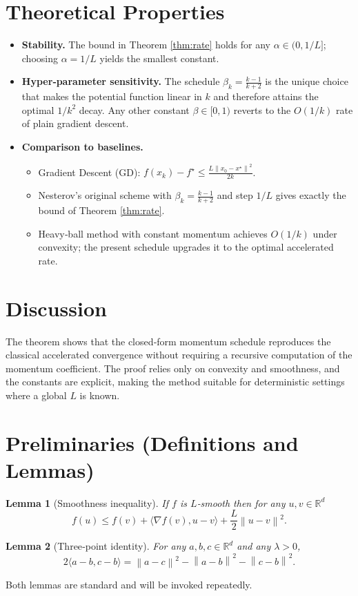 \documentclass{article}
\newtheorem{lemma}{Lemma}
\newcommand{\R}{\mathbb{R}}
\newcommand{\norm}[1]{\left\|#1\right\|}
\newcommand{\grad}{\nabla}
\begin{document}
\section*{Theoretical Properties}
\begin{itemize}
    \item \textbf{Stability.} The bound in Theorem \ref{thm:rate} holds for any $\alpha\in(0,1/L]$; choosing $\alpha=1/L$ yields the smallest constant.
    \item \textbf{Hyper‑parameter sensitivity.} The schedule $\beta_k=\frac{k-1}{k+2}$ is the unique choice that makes the potential function linear in $k$ and therefore attains the optimal $1/k^2$ decay. Any other constant $\beta\in[0,1)$ reverts to the $O(1/k)$ rate of plain gradient descent.
    \item \textbf{Comparison to baselines.}
    \begin{itemize}
        \item Gradient Descent (GD): $f(x_k)-f^\star\le \frac{L\norm{x_0-x^\star}^2}{2k}$.
        \item Nesterov’s original scheme with $\beta_k=\frac{k-1}{k+2}$ and step $1/L$ gives exactly the bound of Theorem \ref{thm:rate}.
        \item Heavy‑ball method with constant momentum achieves $O(1/k)$ under convexity; the present schedule upgrades it to the optimal accelerated rate.
    \end{itemize}
\end{itemize}

\section*{Discussion}
The theorem shows that the closed‑form momentum schedule reproduces the classical accelerated convergence without requiring a recursive computation of the momentum coefficient. The proof relies only on convexity and smoothness, and the constants are explicit, making the method suitable for deterministic settings where a global $L$ is known.

\newpage
\section*{Preliminaries (Definitions and Lemmas)}
\begin{lemma}[Smoothness inequality]\label{lem:smooth}
If $f$ is $L$‑smooth then for any $u,v\in\R^d$
\[
f(u)\le f(v)+\langle\grad f(v),u-v\rangle+\frac{L}{2}\norm{u-v}^2 .
\]
\end{lemma}
\begin{lemma}[Three‑point identity]\label{lem:three}
For any $a,b,c\in\R^d$ and any $\lambda>0$,
\[
2\langle a-b,c-b\rangle = \norm{a-c}^2-\norm{a-b}^2-\norm{c-b}^2 .
\]
\end{lemma}
Both lemmas are standard and will be invoked repeatedly.
\end{document}
